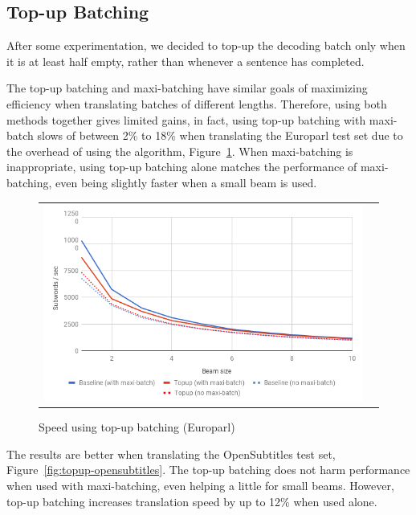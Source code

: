 \documentclass[11pt,a4paper]{article}
\begin{document}
\subsection{Top-up Batching}

After some experimentation, we decided to top-up the decoding batch only when it is at least half empty, rather than whenever a sentence has completed.

The top-up batching and maxi-batching have similar goals of maximizing efficiency when translating batches of different lengths. Therefore, using both methods together gives limited gains, in fact, using top-up batching with maxi-batch slows of between 2\% to 18\% when translating the Europarl test set due to the overhead of using the algorithm, Figure~\ref{fig:topup-europarl}. When maxi-batching is inappropriate, using top-up batching alone matches the performance of maxi-batching, even being slightly faster when a small beam is used.

\begin{figure}
\centering
\begin{tabular}{cc}
{\includegraphics[scale=0.3]{topup-europarl.png}} 
\end{tabular}
\caption{Speed using top-up batching (Europarl)}
\label{fig:topup-europarl}
\end{figure} 

The results are better when translating the OpenSubtitles test set, Figure~\ref{fig:topup-opensubtitles}. The top-up batching does not harm performance when used with maxi-batching, even helping a little for small beams. However, top-up batching increases translation speed by up to 12\% when used alone.
\end{document}
